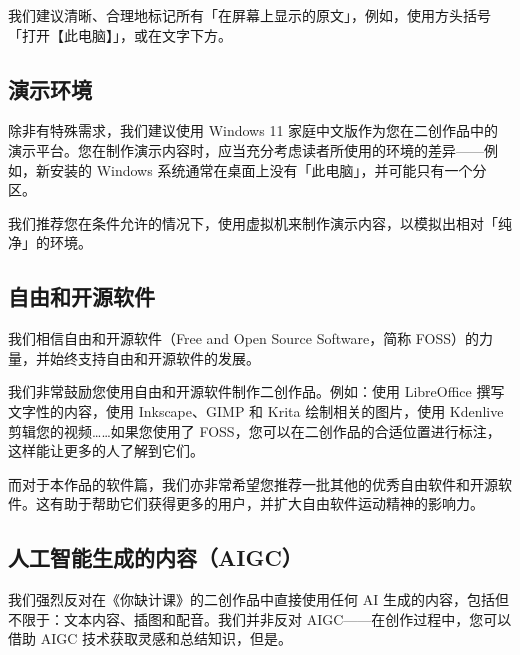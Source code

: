 我们建议清晰、合理地标记所有「在屏幕上显示的原文」，例如，使用方头括号「打开【此电脑】」，或在文字下方。

\subsection{演示环境}

除非有特殊需求，我们建议使用 Windows 11 家庭中文版作为您在二创作品中的演示平台。您在制作演示内容时，应当充分考虑读者所使用的环境的差异——例如，新安装的 Windows 系统通常在桌面上没有「此电脑」，并可能只有一个分区。

我们推荐您在条件允许的情况下，使用虚拟机来制作演示内容，以模拟出相对「纯净」的环境。

\subsection{自由和开源软件}

我们相信自由和开源软件（Free and Open Source Software，简称 FOSS）的力量，并始终支持自由和开源软件的发展。

我们非常鼓励您使用自由和开源软件制作二创作品。例如：使用 LibreOffice 撰写文字性的内容，使用 Inkscape、GIMP 和 Krita 绘制相关的图片，使用 Kdenlive 剪辑您的视频……如果您使用了 FOSS，您可以在二创作品的合适位置进行标注，这样能让更多的人了解到它们。

而对于本作品的软件篇，我们亦非常希望您推荐一批其他的优秀自由软件和开源软件。这有助于帮助它们获得更多的用户，并扩大自由软件运动精神的影响力。

\subsection{人工智能生成的内容（AIGC）}

我们强烈反对在《你缺计课》的二创作品中直接使用任何 AI 生成的内容，包括但不限于：文本内容、插图和配音。我们并非反对 AIGC——在创作过程中，您可以借助 AIGC 技术获取灵感和总结知识，但是。